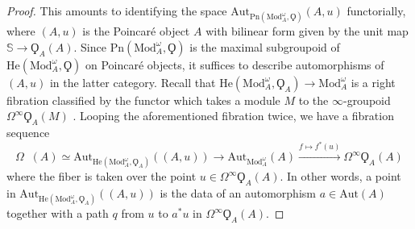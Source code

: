 \documentclass{article}
\DeclareMathOperator{\Picp}{Pic^p} %
\theoremstyle{definition}
\begin{document}
\begin{proof}
	This amounts to identifying the space $\mathrm{Aut}_{\mathrm{Pn}\left(\mathrm{Mod}_A^\omega,\Qoppa\right)}(A,u)$ functorially, where $(A,u)$ is the Poincar{\'e} object $A$ with bilinear form given by the unit map $\mathbb{S}\to \Qoppa_A(A)$. 
    Since $ \mathrm{Pn}\left(\mathrm{Mod}_A^\omega,\Qoppa\right) $ is the maximal subgroupoid of $ \mathrm{He}\left(\mathrm{Mod}_A^\omega,\Qoppa\right) $ on Poincaré objects, it suffices to describe automorphisms of $ (A,u) $ in the latter category.
    Recall that $ \mathrm{He}(\mathrm{Mod}_A^\omega,\Qoppa_A)\to \mathrm{Mod}^\omega_A $ is a right fibration classified by the functor which takes a module $M$ to the $ \infty $-groupoid $ \Omega^\infty \Qoppa_A(M)$ \cite[Definition 2.1.1]{CDHHLMNNSI}. 
    Looping the aforementioned fibration twice, we have a fibration sequence %
    \begin{equation}\label{eq:loops_pnpic_fiber_sequence}
        \Omega\Picp(A) \simeq \mathrm{Aut}_{\mathrm{He}(\mathrm{Mod}_A^\omega,\Qoppa_A)}((A,u)) \to \mathrm{Aut}_{\mathrm{Mod}_A^\omega}(A)\xrightarrow{f \mapsto f^*(u)} \Omega^\infty \Qoppa_A(A)
    \end{equation} 
    where the fiber is taken over the point $ u \in \Omega^\infty \Qoppa_A(A) $. 
    In other words, a point in $ \mathrm{Aut}_{\mathrm{He}(\mathrm{Mod}_A^\omega,\Qoppa_A)}((A,u)) $ is the data of an automorphism $a\in \mathrm{Aut}(A)$ together with a path $q $ from $ u $ to $ a^*u$ in $\Omega^{\infty}\Qoppa_A(A)$.  
	

\end{proof}
\end{document}
